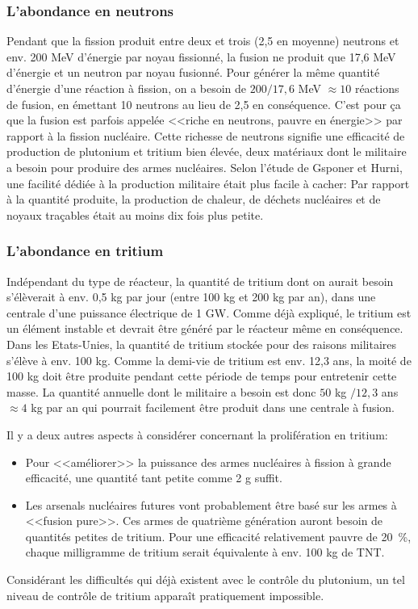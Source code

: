 \documentclass[12pt,a4paper]{article}
\begin{document}
\subsubsection{L'abondance en neutrons}
Pendant que la fission produit entre deux et trois (2,5 en moyenne) neutrons et env. 200 MeV d'énergie par noyau fissionné, la fusion ne produit que 17,6 MeV d'énergie et un neutron par noyau fusionné. Pour générer la même quantité d'énergie d'une réaction à fission, on a besoin de $200 / 17,6$ MeV $\approx 10$ réactions de fusion, en émettant 10 neutrons au lieu de 2,5 en conséquence. C'est pour ça que la fusion est parfois appelée <<riche en neutrons, pauvre en énergie>> par rapport à la fission nucléaire. Cette richesse de neutrons signifie une efficacité de production de plutonium et tritium bien élevée, deux matériaux dont le militaire a besoin pour produire des armes nucléaires. Selon l'étude de Gsponer et Hurni, une facilité dédiée à la production militaire était plus facile à cacher: Par rapport à la quantité produite, la production de chaleur, de déchets nucléaires et de noyaux traçables était au moins dix fois plus petite.

\subsubsection{L'abondance en tritium}
Indépendant du type de réacteur, la quantité de tritium dont on aurait besoin s'élèverait à env. 0,5 kg par jour (entre 100 kg et 200 kg par an), dans une centrale d'une puissance électrique de 1 GW. Comme déjà expliqué, le tritium est un élément instable et devrait être généré par le réacteur même en conséquence. Dans les Etats-Unies, la quantité de tritium stockée pour des raisons militaires s'élève à env. 100 kg. Comme la demi-vie de tritium est env. 12,3 ans, la moité de 100 kg doit être produite pendant cette période de temps pour entretenir cette masse. La quantité annuelle dont le militaire a besoin est donc $50$ kg $/ 12,3$ ans $\approx 4$ kg par an qui pourrait facilement être produit dans une centrale à fusion.

Il y a deux autres aspects à considérer concernant la prolifération en tritium:

\begin{itemize}
\item Pour <<améliorer>> la puissance des armes nucléaires à fission à grande efficacité, une quantité tant petite comme 2 g suffit. 
\item Les arsenals nucléaires futures vont probablement être basé sur les armes à <<fusion pure>>. Ces armes de quatrième génération auront besoin de quantités petites de tritium. Pour une efficacité relativement pauvre de 20~\%, chaque milligramme de tritium serait équivalente à env. 100 kg de TNT. %
\end{itemize}
Considérant les difficultés qui déjà existent avec le contrôle du plutonium, un tel niveau de contrôle de tritium apparaît pratiquement impossible.
\end{document}
